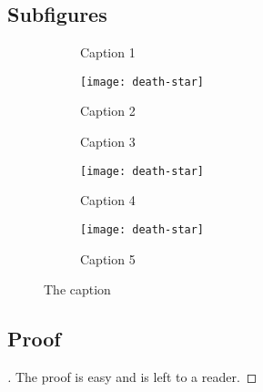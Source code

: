 \documentclass[a4paper,11pt]{article}
\begin{document}
  \subsection*{Subfigures}
  \begin{figure}[htb]
    \centering
    \begin{subfigure}[b]{.475\textwidth}
      \caption{Caption 1}
      \label{fig:1}
    \end{subfigure}
    \hfill
    \begin{subfigure}[b]{.475\textwidth}
      \texttt{[image: death-star]}
      \caption{Caption 2}
      \label{fig:2}
    \end{subfigure}
    \begin{subfigure}[b]{.3\textwidth}
      \caption{Caption 3}
      \label{fig:3}
    \end{subfigure}
    \hfill
    \begin{subfigure}[b]{.3\textwidth}
      \texttt{[image: death-star]}
      \caption{Caption 4}
      \label{fig:4}
    \end{subfigure}
    \hfill
    \begin{subfigure}[b]{.3\textwidth}
      \texttt{[image: death-star]}
      \caption{Caption 5}
      \label{fig:5}
    \end{subfigure}
    \caption{The caption}
    \label{fig:subfigures}
  \end{figure}

  \subsection*{Proof}
    \begin{proof}[\unskip\nopunct]
      The proof is easy and is left to a reader.
    \end{proof}
\end{document}
